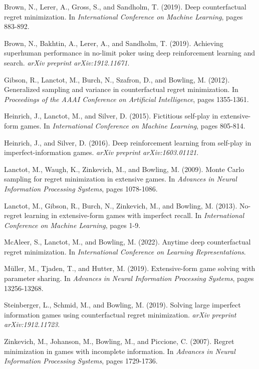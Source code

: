 \documentclass{article}
\begin{document}
\begin{thebibliography}{99}

Brown, N., Lerer, A., Gross, S., and Sandholm, T. (2019).
\newblock Deep counterfactual regret minimization.
\newblock In \emph{International Conference on Machine Learning}, pages 883-892.

Brown, N., Bakhtin, A., Lerer, A., and Sandholm, T. (2019).
\newblock Achieving superhuman performance in no-limit poker using deep reinforcement learning and search.
\newblock \emph{arXiv preprint arXiv:1912.11671}.

Gibson, R., Lanctot, M., Burch, N., Szafron, D., and Bowling, M. (2012).
\newblock Generalized sampling and variance in counterfactual regret minimization.
\newblock In \emph{Proceedings of the AAAI Conference on Artificial Intelligence}, pages 1355-1361.

Heinrich, J., Lanctot, M., and Silver, D. (2015).
\newblock Fictitious self-play in extensive-form games.
\newblock In \emph{International Conference on Machine Learning}, pages 805-814.

Heinrich, J., and Silver, D. (2016).
\newblock Deep reinforcement learning from self-play in imperfect-information games.
\newblock \emph{arXiv preprint arXiv:1603.01121}.

Lanctot, M., Waugh, K., Zinkevich, M., and Bowling, M. (2009).
\newblock Monte Carlo sampling for regret minimization in extensive games.
\newblock In \emph{Advances in Neural Information Processing Systems}, pages 1078-1086.

Lanctot, M., Gibson, R., Burch, N., Zinkevich, M., and Bowling, M. (2013).
\newblock No-regret learning in extensive-form games with imperfect recall.
\newblock In \emph{International Conference on Machine Learning}, pages 1-9.

McAleer, S., Lanctot, M., and Bowling, M. (2022).
\newblock Anytime deep counterfactual regret minimization.
\newblock In \emph{International Conference on Learning Representations}.

Müller, M., Tjaden, T., and Hutter, M. (2019).
\newblock Extensive-form game solving with parameter sharing.
\newblock In \emph{Advances in Neural Information Processing Systems}, pages 13256-13268.

Steinberger, L., Schmid, M., and Bowling, M. (2019).
\newblock Solving large imperfect information games using counterfactual regret minimization.
\newblock \emph{arXiv preprint arXiv:1912.11723}.

Zinkevich, M., Johanson, M., Bowling, M., and Piccione, C. (2007).
\newblock Regret minimization in games with incomplete information.
\newblock In \emph{Advances in Neural Information Processing Systems}, pages 1729-1736.

\end{thebibliography}
\end{document}
